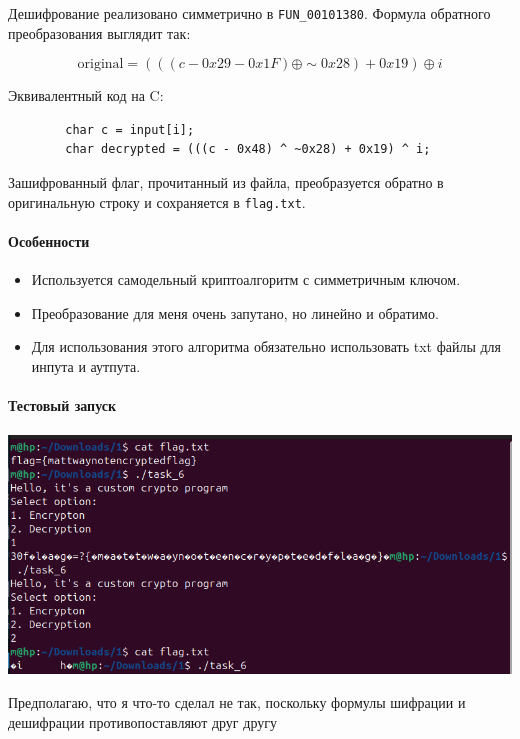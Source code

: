 Дешифрование реализовано симметрично в \texttt{FUN\_00101380}.
Формула обратного преобразования выглядит так:

\[
    \text{original} = (((c - 0x29 - 0x1F) \oplus \sim 0x28) + 0x19) \oplus i
\]

Эквивалентный код на C:

\begin{verbatim}
        char c = input[i];
        char decrypted = (((c - 0x48) ^ ~0x28) + 0x19) ^ i;
\end{verbatim}

Зашифрованный флаг, прочитанный из файла, преобразуется обратно в оригинальную строку и сохраняется в \texttt{flag.txt}.

\paragraph{Особенности}

\begin{itemize}
    \item Используется самодельный криптоалгоритм с симметричным ключом.
    \item Преобразование для меня очень запутано, но линейно и обратимо.
    \item Для использования этого алгоритма обязательно использовать txt файлы для инпута и аутпута.
\end{itemize}

\paragraph{Тестовый запуск}

\paragraph{}
\includegraphics[width=1\linewidth]{static/_task_6}

Предполагаю, что я что-то сделал не так, поскольку формулы шифрации и дешифрации противопоставляют друг другу
